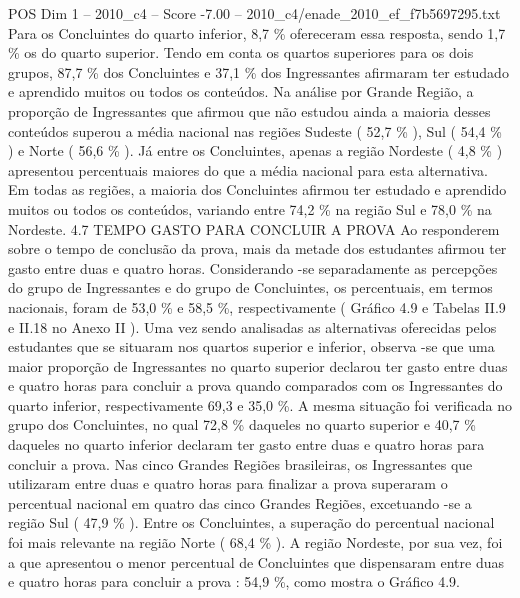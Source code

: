 \begin{textsample}{POS Dim 1 – 2010\_c4 – Score -7.00 – 2010\_c4/enade\_2010\_ef\_f7b5697295.txt}
Para os Concluintes do quarto inferior, 8,7 \% ofereceram essa resposta, sendo 1,7 \% os do quarto superior.
Tendo em conta os quartos superiores para os dois grupos, 87,7 \% dos Concluintes e 37,1 \% dos Ingressantes afirmaram ter estudado e aprendido muitos ou todos os conteúdos.
Na análise por Grande Região, a proporção de Ingressantes que afirmou que não estudou ainda a maioria desses conteúdos superou a média nacional nas regiões Sudeste ( 52,7 \% ), Sul ( 54,4 \% ) e Norte ( 56,6 \% ).
Já entre os Concluintes, apenas a região Nordeste ( 4,8 \% ) apresentou percentuais maiores do que a média nacional para esta alternativa.
Em todas as regiões, a maioria dos Concluintes afirmou ter estudado e aprendido muitos ou todos os conteúdos, variando entre 74,2 \% na região Sul e 78,0 \% na Nordeste. 4.7 TEMPO GASTO PARA CONCLUIR A PROVA Ao responderem sobre o tempo de conclusão da prova, mais da metade dos estudantes afirmou ter gasto entre duas e quatro horas.
Considerando -se separadamente as percepções do grupo de Ingressantes e do grupo de Concluintes, os percentuais, em termos nacionais, foram de 53,0 \% e 58,5 \%, respectivamente ( Gráfico 4.9 e Tabelas II.9 e II.18 no Anexo II ).
Uma vez sendo analisadas as alternativas oferecidas pelos estudantes que se situaram nos quartos superior e inferior, observa -se que uma maior proporção de Ingressantes no quarto superior declarou ter gasto entre duas e quatro horas para concluir a prova quando comparados com os Ingressantes do quarto inferior, respectivamente 69,3 e 35,0 \%.
A mesma situação foi verificada no grupo dos Concluintes, no qual 72,8 \% daqueles no quarto superior e 40,7 \% daqueles no quarto inferior declaram ter gasto entre duas e quatro horas para concluir a prova.
Nas cinco Grandes Regiões brasileiras, os Ingressantes que utilizaram entre duas e quatro horas para finalizar a prova superaram o percentual nacional em quatro das cinco Grandes Regiões, excetuando -se a região Sul ( 47,9 \% ).
Entre os Concluintes, a superação do percentual nacional foi mais relevante na região Norte ( 68,4 \% ).
A região Nordeste, por sua vez, foi a que apresentou o menor percentual de Concluintes que dispensaram entre duas e quatro horas para concluir a prova : 54,9 \%, como mostra o Gráfico 4.9.

\end{textsample}
